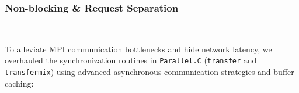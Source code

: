 \subsubsection{Non-blocking \& Request Separation}
\

To alleviate MPI communication bottlenecks and hide network latency, we overhauled the synchronization routines in \texttt{Parallel.C} (\texttt{transfer} and \texttt{transfermix}) using advanced asynchronous communication strategies and buffer caching:

